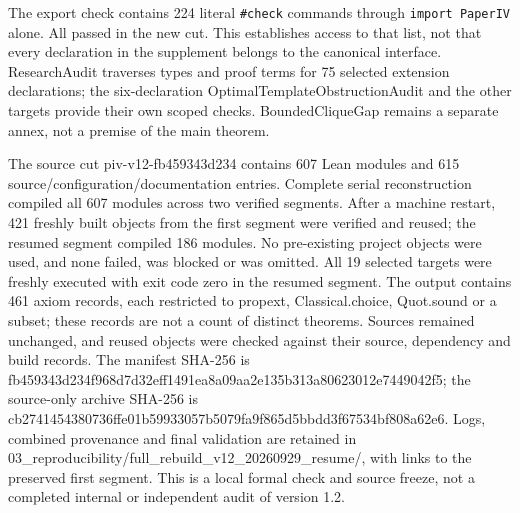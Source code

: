\documentclass[english,11pt,a4paper]{article}
\newcounter{none}
\begin{document}
The export check contains 224 literal \nolinkurl{\#check} commands through \texttt{import\ PaperIV} alone. All passed in the new cut. This establishes access to that list, not that every declaration in the supplement belongs to the canonical interface. ResearchAudit traverses types and proof terms for 75 selected extension declarations; the six-declaration OptimalTemplateObstructionAudit and the other targets provide their own scoped checks. BoundedCliqueGap remains a separate annex, not a premise of the main theorem.

The source cut {\ttfamily\small piv-\discretionary{\hbox{\ensuremath{\hookrightarrow}}}{}{}v12-\discretionary{\hbox{\ensuremath{\hookrightarrow}}}{}{}fb459343d234} contains 607 Lean modules and 615 source/\allowbreak{}configuration/\allowbreak{}documentation entries. Complete serial reconstruction compiled all 607 modules across two verified segments. After a machine restart, 421 freshly built objects from the first segment were verified and reused; the resumed segment compiled 186 modules. No pre-existing project objects were used, and none failed, was blocked or was omitted. All 19 selected targets were freshly executed with exit code zero in the resumed segment. The output contains 461 axiom records, each restricted to {\ttfamily\small propext}, {\ttfamily\small Classical.\discretionary{\hbox{\ensuremath{\hookrightarrow}}}{}{}choice}, {\ttfamily\small Quot.\discretionary{\hbox{\ensuremath{\hookrightarrow}}}{}{}sound} or a subset; these records are not a count of distinct theorems. Sources remained unchanged, and reused objects were checked against their source, dependency and build records. The manifest SHA-256 is {\ttfamily\small fb459343d234\discretionary{\hbox{\ensuremath{\hookrightarrow}}}{}{}f968d7d32eff\discretionary{\hbox{\ensuremath{\hookrightarrow}}}{}{}1491ea8a09aa\discretionary{\hbox{\ensuremath{\hookrightarrow}}}{}{}2e135b313a80\discretionary{\hbox{\ensuremath{\hookrightarrow}}}{}{}623012e74490\discretionary{\hbox{\ensuremath{\hookrightarrow}}}{}{}42f5}; the source-only archive SHA-256 is {\ttfamily\small cb2741454380\discretionary{\hbox{\ensuremath{\hookrightarrow}}}{}{}736ffe01b599\discretionary{\hbox{\ensuremath{\hookrightarrow}}}{}{}33057b5079fa\discretionary{\hbox{\ensuremath{\hookrightarrow}}}{}{}9f865d5bbdd3\discretionary{\hbox{\ensuremath{\hookrightarrow}}}{}{}f67534bf808a\discretionary{\hbox{\ensuremath{\hookrightarrow}}}{}{}62e6}. Logs, combined provenance and final validation are retained in {\ttfamily\small 03\_\discretionary{\hbox{\ensuremath{\hookrightarrow}}}{}{}reproducibil\discretionary{\hbox{\ensuremath{\hookrightarrow}}}{}{}ity/\discretionary{\hbox{\ensuremath{\hookrightarrow}}}{}{}full\_\discretionary{\hbox{\ensuremath{\hookrightarrow}}}{}{}rebuild\_\discretionary{\hbox{\ensuremath{\hookrightarrow}}}{}{}v12\_\discretionary{\hbox{\ensuremath{\hookrightarrow}}}{}{}20260929\_\discretionary{\hbox{\ensuremath{\hookrightarrow}}}{}{}resume/}, with links to the preserved first segment. This is a local formal check and source freeze, not a completed internal or independent audit of version 1.2.
\end{document}
